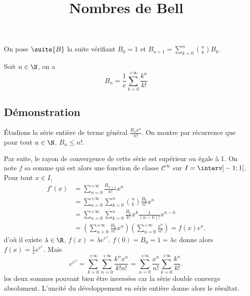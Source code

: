 \documentclass[fontsize=12pt,twoside=false,parskip=half,french]{scrartcl}
\title{Nombres de Bell}
\date{}
\author{}
\begin{document}
\maketitle
   On pose $\suite{B}$ la suite vérifiant $B_0 = 1$ et $B_{n + 1} = \sum_{k = 0}^n \binom{n}{k} B_k$.
   \begin{Theoreme}
      Soit $n \in \N$, on a
      \[
        B_n = \frac{1}{e} \sum_{k = 0}^{+\infty} \frac{k^n}{k!}
      \]
   \end{Theoreme}
   \subsection{Démonstration}
      Étudions la série entière de terme général $\frac{B_n x^n}{n!}$. 
      On montre par récurrence que pour tout $n \in \N$, $B_n \leq n!$.
      
      Par suite, le rayon de convergence de cette série est supérieur ou égale à 1.
      On note $f$ sa somme qui est alors une fonction de classe $\mathcal{C}^{\infty}$
      sur $I = \interv]-1; 1[$. Pour tout $x \in I$,
      \begin{align*}
        f'(x) &= \sum_{n = 0}^{+\infty} \frac{B_{n + 1}}{n!} x^n\\
              &= \sum_{n = 0}^{+\infty} \sum_{k = 0}^n \binom{n}{k} \frac{B_{k}}{n!} x^n\\
              &= \sum_{n = 0}^{+\infty} \sum_{k = 0}^n \frac{B_{k}}{k!} x^k 
                                                       \frac{1}{(n -k)!} x^{n - k}\\ 
              &= \left(\sum_{n = 0}^{+\infty} \frac{B_{n}}{n!} x^n\right) 
                 \left(\sum_{n = 0}^{+\infty} \frac{x^n}{n!}\right)
              = f(x)e^x. 
      \end{align*}
      d'où il existe $\lambda \in \R$, $f(x) = \lambda e^{e^x}$. 
      $f(0) = B_0 = 1 = \lambda e$ donne alors $f(x) = \frac{1}{e}e^{e^x}$. Mais
      \[
        e^{e^x} = \sum_{k = 0}^{+\infty} \sum_{n = 0}^{+\infty} \frac{k^n x^n}{k!n!}
                = \sum_{n = 0}^{+\infty} \frac{x^n}{n!} \sum_{k = 0}^{+\infty} \frac{k^n}{k!}.
      \]
      les deux sommes pouvant bien être inversées car la série double converge absolument.
      L'uncité du développement en série entière donne alors le résultat.
\end{document}
